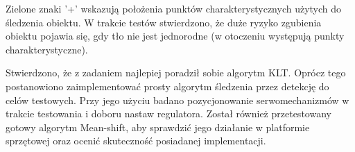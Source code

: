 Zielone znaki '+' wskazują położenia punktów charakterystycznych użytych do śledzenia obiektu. W trakcie testów stwierdzono, że duże ryzyko zgubienia obiektu pojawia się, gdy tło nie jest jednorodne (w otoczeniu występują punkty charakterystyczne).

Stwierdzono, że z zadaniem najlepiej poradził sobie algorytm KLT. 
Oprócz tego postanowiono zaimplementować prosty algorytm śledzenia przez detekcję do celów testowych.  
Przy jego użyciu badano pozycjonowanie serwomechanizmów w trakcie testowania i doboru nastaw regulatora. 
Został również przetestowany gotowy algorytm Mean-shift, aby sprawdzić jego działanie w platformie sprzętowej oraz ocenić skuteczność posiadanej implementacji.

